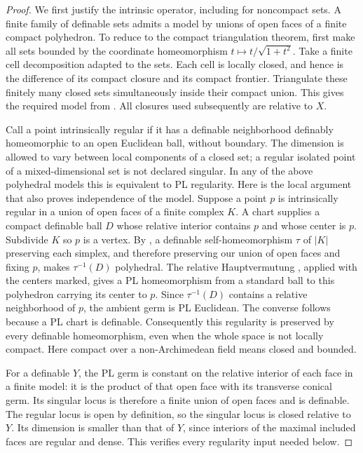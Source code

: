 \begin{proof}
We first justify the intrinsic operator, including for noncompact
sets. A finite family of definable sets admits a model by unions
of open faces of a finite compact polyhedron. To reduce to the
compact triangulation theorem, first make all sets bounded by the
coordinate homeomorphism $t\mapsto t/\sqrt{1+t^2}$. Take a finite
cell decomposition adapted to the sets. Each cell is locally
closed, and hence is the difference of its compact closure and
its compact frontier. Triangulate these finitely many closed
sets simultaneously inside their compact union. This gives the
required model from \cite[Theorem 2.2(1), p.~6]{Shiota2010}.
All closures used subsequently are relative to $X$.

Call a point intrinsically regular if it has a definable
neighborhood definably homeomorphic to an open Euclidean ball,
without boundary. The dimension is allowed to vary between local
components of a closed set; a regular isolated point of a
mixed-dimensional set is not declared singular. In any of the above polyhedral models this
is equivalent to PL regularity. Here is the local argument that
also proves independence of the model. Suppose a point $p$ is
intrinsically regular in a union of open faces of a finite
complex $K$. A chart supplies a compact definable ball $D$ whose
relative interior contains $p$ and whose center is $p$. Subdivide
$K$ so $p$ is a vertex. By
\cite[Theorem 2.2(2), p.~6]{Shiota2010}, a definable self-homeomorphism
$\tau$ of $|K|$ preserving each simplex, and therefore preserving
our union of open faces and fixing $p$, makes $\tau^{-1}(D)$
polyhedral. The relative Hauptvermutung
\cite[Theorem 2.1, p.~5]{Shiota2010}, applied with the centers
marked, gives a PL homeomorphism from a standard ball to this
polyhedron carrying its center to $p$. Since $\tau^{-1}(D)$
contains a relative neighborhood of $p$, the ambient germ is
PL Euclidean. The converse follows because a PL chart is definable.
Consequently this regularity is preserved by every definable
homeomorphism, even when the whole space is not locally compact.
Here compact over a non-Archimedean field means closed and bounded.

For a definable $Y$, the PL germ is constant on the relative
interior of each face in a finite model: it is the product of
that open face with its transverse conical germ. Its singular
locus is therefore a finite union of open faces and is definable.
The regular locus is open by definition, so the singular locus
is closed relative to $Y$. Its dimension is smaller than that
of $Y$, since interiors of the maximal included faces are regular
and dense. This verifies every regularity input needed below.


\end{proof}
